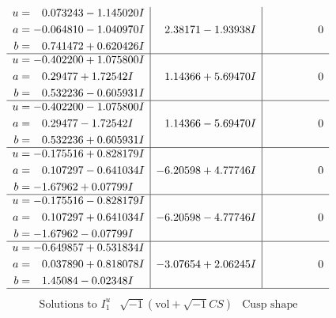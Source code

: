 \documentclass[1p]{elsarticle_modified}
\theoremstyle{definition}
\newcommand{\I}{\sqrt{-1}}
\begin{document}
$$\begin{array}{c|c|c}
\begin{aligned}
u &= \phantom{-}0.073243 - 1.145020 I \\
a &= -0.064810 - 1.040970 I \\
b &= \phantom{-}0.741472 + 0.620426 I\end{aligned}
 & \phantom{-}2.38171 - 1.93938 I & \phantom{-0.000000 } 0 \\ \hline\begin{aligned}
u &= -0.402200 + 1.075800 I \\
a &= \phantom{-}0.29477 + 1.72542 I \\
b &= \phantom{-}0.532236 - 0.605931 I\end{aligned}
 & \phantom{-}1.14366 + 5.69470 I & \phantom{-0.000000 } 0 \\ \hline\begin{aligned}
u &= -0.402200 - 1.075800 I \\
a &= \phantom{-}0.29477 - 1.72542 I \\
b &= \phantom{-}0.532236 + 0.605931 I\end{aligned}
 & \phantom{-}1.14366 - 5.69470 I & \phantom{-0.000000 } 0 \\ \hline\begin{aligned}
u &= -0.175516 + 0.828179 I \\
a &= \phantom{-}0.107297 - 0.641034 I \\
b &= -1.67962 + 0.07799 I\end{aligned}
 & -6.20598 + 4.77746 I & \phantom{-0.000000 } 0 \\ \hline\begin{aligned}
u &= -0.175516 - 0.828179 I \\
a &= \phantom{-}0.107297 + 0.641034 I \\
b &= -1.67962 - 0.07799 I\end{aligned}
 & -6.20598 - 4.77746 I & \phantom{-0.000000 } 0 \\ \hline\begin{aligned}
u &= -0.649857 + 0.531834 I \\
a &= \phantom{-}0.037890 + 0.818078 I \\
b &= \phantom{-}1.45084 - 0.02348 I\end{aligned}
 & -3.07654 + 2.06245 I & \phantom{-0.000000 } 0\\
 \hline 
 \end{array}$$\newpage$$\begin{array}{c|c|c}  
\text{Solutions to }I^u_{1}& \I (\text{vol} + \sqrt{-1}CS) & \text{Cusp shape}\\
 \hline 
\begin{aligned}

\end{aligned}
\end{array}$$
\end{document}

